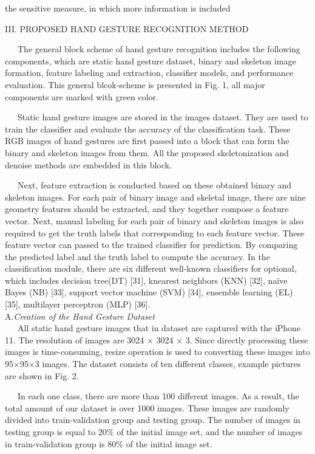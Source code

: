 \documentclass[10pt, a4paper]{article}
\begin{document}
\begin{multicols}{2}
the sensitive measure, in which more information is
included\
\begin{center}
    III. PROPOSED HAND GESTURE RECOGNITION
METHOD

\end{center}
 \ \ \ The general block scheme of hand gesture recognition
includes the following components, which are static hand
gesture dataset, binary and skeleton image formation,
feature labeling and extraction, classifier models, and
performance evaluation. This general blcok-scheme is
presented in Fig. 1, all major components are marked
with green color.

 \ \ \ Static hand gesture images are stored in the images
dataset. They are used to train the classifier and evaluate
the accuracy of the classification task. These RGB images of hand gestures are first passed into a block that
can form the binary and skeleton images from them. All
the proposed skeletonization and denoise methods are
embedded in this block.

 \ \ \ Next, feature extraction is conducted based on these
obtained binary and skeleton images. For each pair of
binary image and skeletal image, there are nine geometry
features should be extracted, and they together compose
a feature vector. Next, manual labeling for each pair of
binary and skeleton images is also required to get the
truth labels that corresponding to each feature vector.
These feature vector can passed to the trained classifier
for prediction. By comparing the predicted label and the
truth label to compute the accuracy. In the classification
module, there are six different well-known classifiers
for optional, which includes decision tree(DT) [31], knearest neighbors (KNN) [32], naïve Bayes (NB) [33],
support vector machine (SVM) [34], ensemble learning
(EL) [35], multilayer perceptron (MLP) [36].\\

A.\textit{Creation of the Hand Gesture Dataset}\\

 \ \ \ All static hand gesture images that in dataset are
captured with the iPhone 11. The resolution of images are
3024 × 3024 × 3. Since directly processing these images
is time-consuming, resize operation is used to converting
these images into 95×95×3 images. The dataset consists
of ten different classes, example pictures are shown in
Fig. 2.

 \ \ \ In each one class, there are more than 100 different
images. As a result, the total amount of our dataset is
over 1000 images. These images are randomly divided
into train-validation group and testing group. The number
of images in testing group is equal to 20\% of the initial
image set, and the number of images in train-validation
group is 80\% of the initial image set. \\


\end{multicols}
\end{document}
